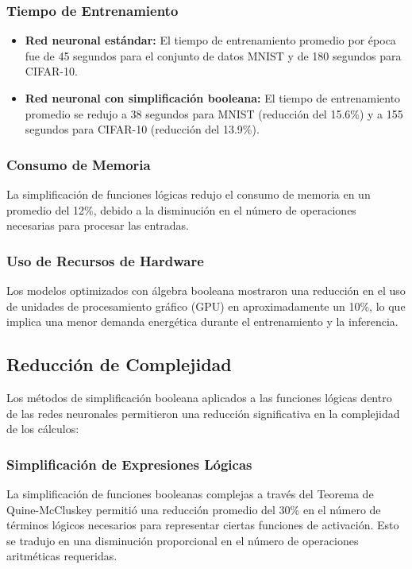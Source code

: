 \documentclass{article}
\begin{document}
\begin{multicols}{2}
\subsubsection{Tiempo de Entrenamiento}
\begin{itemize}
    \item \textbf{Red neuronal estándar:} El tiempo de entrenamiento promedio por época fue de 45 
    segundos para el conjunto de datos MNIST y de 180 segundos para CIFAR-10.
    \item \textbf{Red neuronal con simplificación booleana:} El tiempo de entrenamiento promedio se 
    redujo a 38 segundos para MNIST (reducción del 15.6\%) y a 155 segundos para 
    CIFAR-10 (reducción del 13.9\%).
\end{itemize}

\subsubsection{Consumo de Memoria}
La simplificación de funciones lógicas redujo el consumo de memoria en un promedio del 12\%, 
debido a la disminución en el número de operaciones necesarias para procesar las entradas.

\subsubsection{Uso de Recursos de Hardware}
Los modelos optimizados con álgebra booleana mostraron una reducción en el uso de unidades de 
procesamiento gráfico (GPU) en aproximadamente un 10\%, lo que implica una menor demanda energética 
durante el entrenamiento y la inferencia.

\subsection{Reducción de Complejidad}
Los métodos de simplificación booleana aplicados a las funciones lógicas dentro de las redes 
neuronales permitieron una reducción significativa en la complejidad de los cálculos:

\subsubsection{Simplificación de Expresiones Lógicas}
La simplificación de funciones booleanas complejas a través del Teorema de Quine-McCluskey 
permitió una reducción promedio del 30\% en el número de términos lógicos necesarios para 
representar ciertas funciones de activación. Esto se tradujo en una disminución proporcional 
en el número de operaciones aritméticas requeridas.


\end{multicols}
\end{document}

